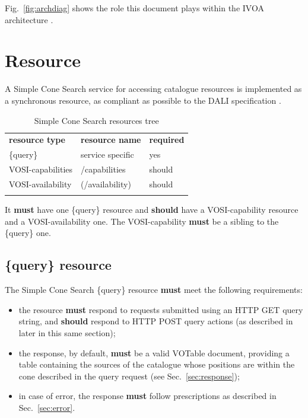 \documentclass[11pt,a4paper]{ivoa}
\begin{document}
Fig.~\ref{fig:archdiag} shows the role this document plays within the
IVOA architecture \citep{note:VOARCH}.

\section{Resource}
\label{sec:resif}

A Simple Cone Search service for accessing catalogue resources is implemented as a
synchronous resource, as compliant as possible to the DALI specification
\citep{std:DALI}.

\begin{table}[th]
\begin{center}
\begin{tabular}{p{}p{}p{}}
\sptablerule
\textbf{resource type}&\textbf{resource name}&\textbf{required}\\
\sptablerule
\{query\} & service specific & yes\\
VOSI-capabilities & /capabilities & should\\
VOSI-availability & (/availability) & should\\
\sptablerule
\label{table:resources}
\end{tabular}
\caption{Simple Cone Search resources tree}
\end{center}
\end{table}

It \textbf{must} have one \{query\} resource and \textbf{should} have a
VOSI-capability resource and a VOSI-availability one. The
VOSI-capability \textbf{must} be a sibling to the \{query\} one.

\subsection{\{query\} resource}
\label{sec:basepar}
The Simple Cone Search \{query\} resource \textbf{must} meet the following requirements:
\begin{itemize}
	\item the resource \textbf{must} respond to requests submitted using
an HTTP GET query string, and \textbf{should} respond to HTTP POST query
actions (as described in later in this same section);
	\item the response, by default, \textbf{must} be a valid VOTable
document, providing a table containing the sources of the catalogue
whose positions are within the cone described in the query request (see
Sec.~\ref{sec:response});
	\item in case of error, the response \textbf{must} follow
prescriptions as described in Sec.~\ref{sec:error}.
\end{itemize}
\end{document}

